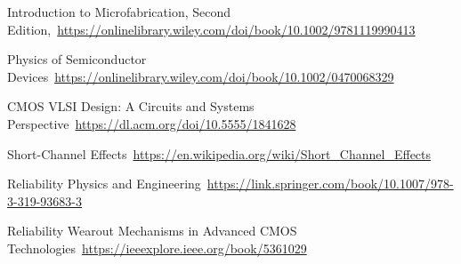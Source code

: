 \cleardoublepage
{}
{}
\begin{thebibliography}{99}

Introduction to Microfabrication, Second Edition,\ \url{https://onlinelibrary.wiley.com/doi/book/10.1002/9781119990413}

Physics of Semiconductor Devices\ \url{https://onlinelibrary.wiley.com/doi/book/10.1002/0470068329}

CMOS VLSI Design: A Circuits and Systems Perspective\ \url{https://dl.acm.org/doi/10.5555/1841628}

Short-Channel Effects\ \url{https://en.wikipedia.org/wiki/Short_Channel_Effects}

Reliability Physics and Engineering\ \url{https://link.springer.com/book/10.1007/978-3-319-93683-3}

Reliability Wearout Mechanisms in Advanced CMOS Technologies\ \url{https://ieeexplore.ieee.org/book/5361029}







\end{thebibliography}
